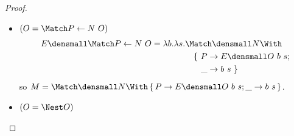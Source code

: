 \begin{proof}
\begin{enumerate}[(a)]
\begin{itemize}
    \item $(O = \Match P \gets N ~ O)$
        \begin{align*}
          & \quad E\den{\Match P \gets N ~ O}
          =
          \lambda b. \lambda s.
          \begin{aligned}[t]
            &\Match \den{N} \With \\
            &\quad
            \begin{aligned}[t]
              \{~
              P &\to E\den{O}~b~s; \\
              \_ &\to b~s
              ~\}
            \end{aligned}
          \end{aligned}
        \end{align*}
        so $M = \Match \den{N} \With \set{P \to E\den{O}~b~s; \_ \to b~s}$.
      \item $(O = \Nest O)$

\end{itemize}
\end{enumerate}
\end{proof}
